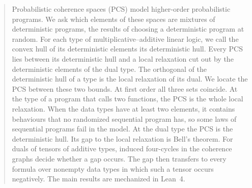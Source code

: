 \begin{abstract}
Probabilistic coherence spaces (PCS) model higher-order probabilistic
programs.
We ask which elements of these spaces are mixtures of deterministic
programs, the results of choosing a deterministic program at random. For
each type of multiplicative--additive linear logic, we call the convex
hull of its deterministic elements its deterministic hull. Every PCS lies
between its deterministic hull and a local relaxation cut out
by the deterministic elements of the dual type. The orthogonal of the
deterministic hull of a type is the local relaxation of its dual. We
locate the PCS between these two bounds. At first order all
three sets coincide. At the type of a program that calls two functions,
the PCS is the whole local relaxation. When the data types
have at least two elements, it contains behaviours that no randomized
sequential program has, so some laws of sequential programs fail in the
model. At the dual type the PCS is the deterministic hull.
Its gap to the local relaxation is Bell's theorem. For duals of tensors of
additive types, induced four-cycles in the coherence graphs decide whether
a gap occurs. The gap then transfers to every formula over nonempty data
types in which such a tensor occurs negatively. The main results are
mechanized in Lean~4.

\end{abstract}
